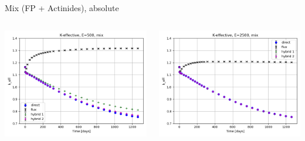 \documentclass[
	11pt, %
	aspectratio=169, %
]{beamer}
\begin{document}
\begin{frame}{Mix (FP + Actinides), absolute}
\begin{columns}[c]
\begin{column}{0.39\textwidth}
			\includegraphics[width=\textwidth]{../figures/keff/keff_mix_500.png}
		\end{column}
		\begin{column}{0.39\textwidth}
			\includegraphics[width=\textwidth]{../figures/keff/keff_mix_2500.png}


\end{column}
\end{columns}
\end{frame}
\end{document}
